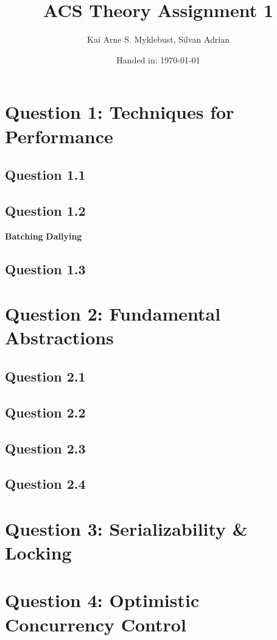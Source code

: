 \documentclass[12pt,a4paper]{article}
\begin{document}
\title{ACS Theory Assignment 1}
\subtitle{}

\author{Kai Arne S. Myklebust, Silvan Adrian}
\date{Handed in: \today}
	
\maketitle
\tableofcontents

\section{Question 1: Techniques for Performance}
\subsection{Question 1.1}
\subsection{Question 1.2}
\textbf{Batching}
\textbf{Dallying}
\subsection{Question 1.3}

\section{Question 2: Fundamental Abstractions}
\subsection{Question 2.1}
\subsection{Question 2.2}
\subsection{Question 2.3}
\subsection{Question 2.4}

\section{Question 3: Serializability \& Locking}

\section{Question 4: Optimistic Concurrency Control}
\end{document}
